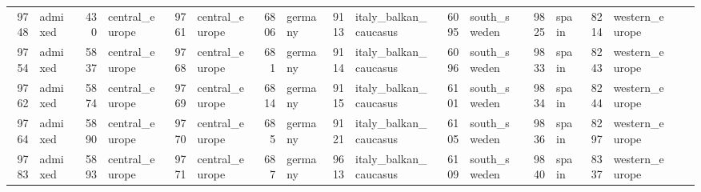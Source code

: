 \begin{table}[h]
{\begin{tabular}{rl|rl|rl|rl|rl|rl|rl|rl|rl}
			9748                   & admixed         & 430                    & central\_europe & 9761                   & central\_europe & 6806                   & germany         & 9113                   & italy\_balkan\_caucasus & 6095                   & south\_sweden           & 9825                   & spain           & 8214                   & western\_europe &                          &                 \\
			9754                   & admixed         & 5837                   & central\_europe & 9768                   & central\_europe & 681                    & germany         & 9114                   & italy\_balkan\_caucasus & 6096                   & south\_sweden           & 9833                   & spain           & 8243                   & western\_europe &                          &                 \\
			9762                   & admixed         & 5874                   & central\_europe & 9769                   & central\_europe & 6814                   & germany         & 9115                   & italy\_balkan\_caucasus & 6101                   & south\_sweden           & 9834                   & spain           & 8244                   & western\_europe &                          &                 \\
			9764                   & admixed         & 5890                   & central\_europe & 9770                   & central\_europe & 685                    & germany         & 9121                   & italy\_balkan\_caucasus & 6105                   & south\_sweden           & 9836                   & spain           & 8297                   & western\_europe &                          &                 \\
			9783                   & admixed         & 5893                   & central\_europe & 9771                   & central\_europe & 687                    & germany         & 9613                   & italy\_balkan\_caucasus & 6109                   & south\_sweden           & 9840                   & spain           & 8337                   & western\_europe &                          &                
		\end{tabular}
	}
	\label{tab:mappingPopulation}
\end{table}

